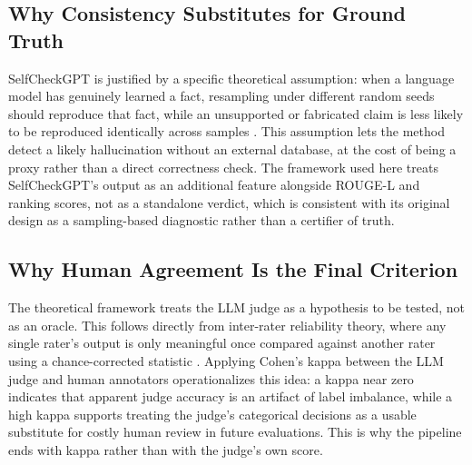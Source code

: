 \documentclass[conference]{IEEEtran}
\begin{document}
\subsection{Why Consistency Substitutes for Ground Truth}
SelfCheckGPT is justified by a specific theoretical assumption: when a language model has genuinely learned a fact, resampling under different random seeds should reproduce that fact, while an unsupported or fabricated claim is less likely to be reproduced identically across samples \cite{manakul2023selfcheckgpt}. This assumption lets the method detect a likely hallucination without an external database, at the cost of being a proxy rather than a direct correctness check. The framework used here treats SelfCheckGPT's output as an additional feature alongside ROUGE-L and ranking scores, not as a standalone verdict, which is consistent with its original design as a sampling-based diagnostic rather than a certifier of truth.

\subsection{Why Human Agreement Is the Final Criterion}
The theoretical framework treats the LLM judge as a hypothesis to be tested, not as an oracle. This follows directly from inter-rater reliability theory, where any single rater's output is only meaningful once compared against another rater using a chance-corrected statistic \cite{cohen1960coefficient}. Applying Cohen's kappa between the LLM judge and human annotators operationalizes this idea: a kappa near zero indicates that apparent judge accuracy is an artifact of label imbalance, while a high kappa supports treating the judge's categorical decisions as a usable substitute for costly human review in future evaluations. This is why the pipeline ends with kappa rather than with the judge's own score.
\end{document}
